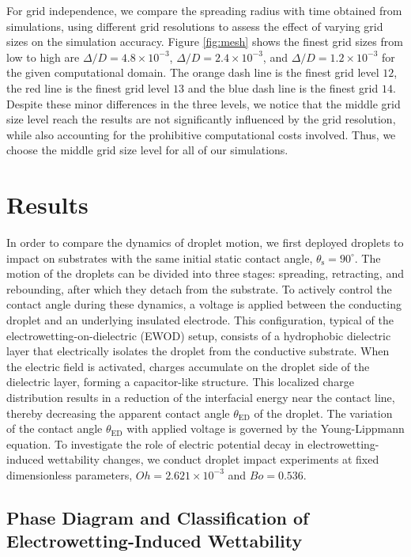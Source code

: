 \documentclass[lineno]{cls/jfm}
\begin{document}
For grid independence, we compare the spreading radius with time obtained from simulations, using different grid resolutions to assess the effect of varying grid sizes on the simulation accuracy. Figure \ref{fig:mesh} shows the finest grid sizes from low to high are $\Delta/D = 4.8 \times 10^{-3}$, $\Delta/D = 2.4 \times 10^{-3}$, and $\Delta/D = 1.2 \times 10^{-3}$ for the given computational domain. The orange dash line is the finest grid level $12$, the red line is the finest grid level $13$ and the blue dash line is the finest grid $14$. Despite these minor differences in the three levels, we notice that the middle grid size level reach the results are not significantly influenced by the grid resolution, while also accounting for the prohibitive computational costs involved. Thus, we choose the middle grid size level for all of our simulations.

\section{Results}\label{sec:Results}

In order to compare the dynamics of droplet motion, we first deployed droplets to impact on substrates with the same initial static contact angle, $\theta_{\mathrm{s}} = 90^\circ$. The motion of the droplets can be divided into three stages: spreading, retracting, and rebounding, after which they detach from the substrate. To actively control the contact angle during these dynamics, a voltage is applied between the conducting droplet and an underlying insulated electrode. This configuration, typical of the electrowetting-on-dielectric (EWOD) setup, consists of a hydrophobic dielectric layer that electrically isolates the droplet from the conductive substrate. When the electric field is activated, charges accumulate on the droplet side of the dielectric layer, forming a capacitor-like structure. This localized charge distribution results in a reduction of the interfacial energy near the contact line, thereby decreasing the apparent contact angle $\theta_{\mathrm{ED}}$ of the droplet. The variation of the contact angle $\theta_{\mathrm{ED}}$ with applied voltage is governed by the Young-Lippmann equation. To investigate the role of electric potential decay in electrowetting-induced wettability changes, we conduct droplet impact experiments at fixed dimensionless parameters, $Oh = 2.621 \times 10^{-3}$ and $Bo = 0.536$.

\subsection{Phase Diagram and Classification of Electrowetting-Induced Wettability}
\end{document}
